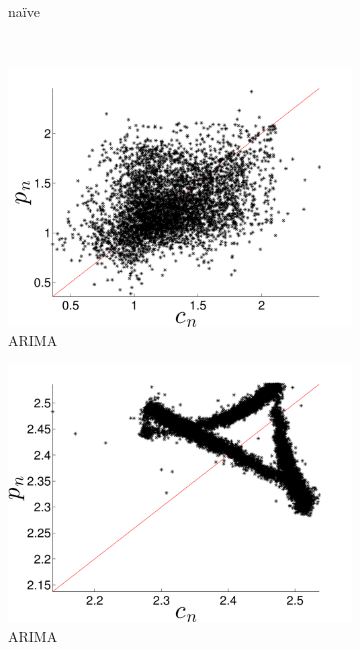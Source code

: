 \begin{figure}[htbp]
\begin{subfigure}{0.49\textwidth}
    \caption{\col na\"ive }
    \label{fig:gccMEAN}
  \end{subfigure}%
  \\
  \begin{subfigure}{0.49\textwidth}
    \includegraphics[width=\textwidth]{figs/gccARIMAForecast}
    \caption{\gcc ARIMA }
    \label{fig:gccARIMA}
  \end{subfigure}%
  \begin{subfigure}{0.49\textwidth}
    \includegraphics[width=\textwidth]{figs/colARIMAForecast}
    \caption{\col ARIMA}
    \label{fig:colARIMA}
  \end{subfigure}
  \\
      \begin{subfigure}{0.49\textwidth}

\end{subfigure}
\end{figure}
